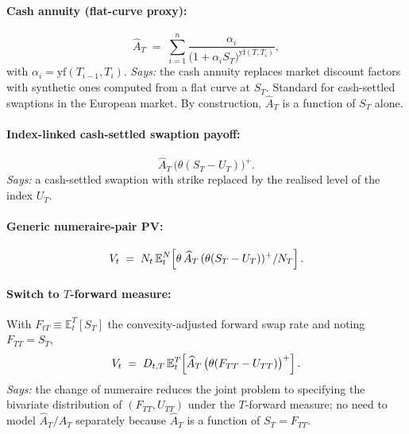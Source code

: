 \documentclass[11pt,a4paper]{article}
\begin{document}
\paragraph{Cash annuity (flat-curve proxy):}
\begin{equation}\label{eq:hybrid-cash-ann}
  \widehat A_T \;=\; \sum_{i=1}^{n} \frac{\alpha_i}{\bigl(1 + \alpha_i S_T\bigr)^{\mathrm{yf}(T, T_i)}},
\end{equation}
with $\alpha_i = \mathrm{yf}(T_{i-1}, T_i)$.
\textit{Says:} the cash annuity replaces market discount factors with
synthetic ones computed from a flat curve at $S_T$. Standard for
cash-settled swaptions in the European market. By construction,
$\widehat A_T$ is a function of $S_T$ alone.

\paragraph{Index-linked cash-settled swaption payoff:}
\begin{equation}\label{eq:hybrid-payoff}
  \widehat A_T \, \bigl(\theta(S_T - U_T)\bigr)^+.
\end{equation}
\textit{Says:} a cash-settled swaption with strike replaced by the
realised level of the index $U_T$.

\paragraph{Generic numeraire-pair PV:}
\begin{equation}\label{eq:hybrid-pv-generic}
  V_t \;=\; N_{t} \, \mathbb{E}^N_t\!\left[ \theta \, \widehat A_T \, (\theta(S_T - U_T))^+ / N_{T} \right].
\end{equation}

\paragraph{Switch to $T$-forward measure:}
With $F_{tT} \equiv \mathbb{E}^T_t[S_T]$ the convexity-adjusted
forward swap rate and noting $F_{TT} = S_T$,
\begin{equation}\label{eq:hybrid-pv-fwd}
  V_t \;=\; D_{t,T}\, \mathbb{E}^T_t\!\left[ \widehat A_T \, \bigl(\theta(F_{TT} - U_{TT})\bigr)^+ \right].
\end{equation}
\textit{Says:} the change of numeraire reduces the joint problem to
specifying the bivariate distribution of $(F_{TT}, U_{TT})$ under the
$T$-forward measure; no need to model $\widehat A_T / A_T$ separately
because $\widehat A_T$ is a function of $S_T = F_{TT}$.
\end{document}

